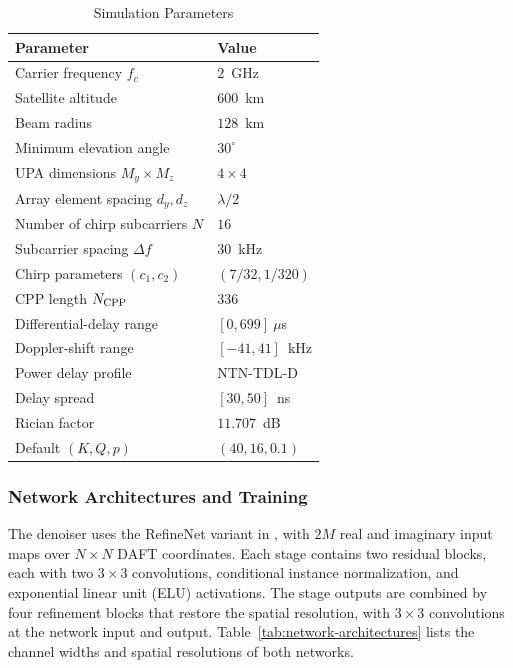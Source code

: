 \begin{table}[!t]
\caption{Simulation Parameters}
\label{tab:simulation-parameters}
\centering
\small
\begin{tabular}{@{}ll@{}}
\toprule
Parameter & Value \\
\midrule
Carrier frequency $f_c$ & $2$~GHz \\
Satellite altitude & $600$~km \\
Beam radius & $128$~km \\
Minimum elevation angle & $30^\circ$ \\
UPA dimensions $M_y\times M_z$ & $4\times4$ \\
Array element spacing $d_y,d_z$ & $\lambda/2$ \\
Number of chirp subcarriers $N$ & $16$ \\
Subcarrier spacing $\Delta f$ & $30$~kHz \\
Chirp parameters $(c_1,c_2)$ & $(7/32,1/320)$ \\
CPP length $N_{\rm CPP}$ & $336$ \\
Differential-delay range & $[0,699]~\mu$s \\
Doppler-shift range & $[-41,41]$~kHz \\
Power delay profile & NTN-TDL-D \\
Delay spread & $[30,50]$~ns \\
Rician factor & $11.707$~dB \\
Default $(K,Q,p)$ & $(40,16,0.1)$ \\
\bottomrule
\end{tabular}
\end{table}

\subsubsection{Network Architectures and Training}
\label{sec:network-settings}
\label{sec:training-settings}
The denoiser uses the RefineNet \cite{lin2017} variant in
\cite[Appendix~A]{song2019}, with $2M$ real and imaginary input maps over
$N\times N$ DAFT coordinates.
Each stage contains two residual blocks, each with two
$3\times3$ convolutions, conditional instance normalization, and
exponential linear unit (ELU) activations.
The stage outputs are combined by four refinement blocks that restore
the spatial resolution, with $3\times3$ convolutions at the network
input and output. Table~\ref{tab:network-architectures} lists the channel
widths and spatial resolutions of both networks.

